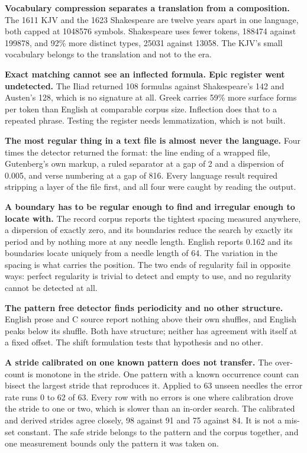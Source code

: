 \textbf{Vocabulary compression separates a translation from a composition.} The 1611 KJV and the 1623 Shakespeare are twelve years apart in one language, both capped at 1048576 symbols. Shakespeare uses fewer tokens, 188474 against 199878, and 92\% more distinct types, 25031 against 13058. The KJV's small vocabulary belongs to the translation and not to the era.

\textbf{Exact matching cannot see an inflected formula. Epic register went undetected.} The Iliad returned 108 formulas against Shakespeare's 142 and Austen's 128, which is no signature at all. Greek carries 59\% more surface forms per token than English at comparable corpus size. Inflection does that to a repeated phrase. Testing the register needs lemmatization, which is not built.

\textbf{The most regular thing in a text file is almost never the language.} Four times the detector returned the format: the line ending of a wrapped file, Gutenberg's own markup, a ruled separator at a gap of 2 and a dispersion of 0.005, and verse numbering at a gap of 816. Every language result required stripping a layer of the file first, and all four were caught by reading the output.

\textbf{A boundary has to be regular enough to find and irregular enough to locate with.} The record corpus reports the tightest spacing measured anywhere, a dispersion of exactly zero, and its boundaries reduce the search by exactly its period and by nothing more at any needle length. English reports 0.162 and its boundaries locate uniquely from a needle length of 64. The variation in the spacing is what carries the position. The two ends of regularity fail in opposite ways: perfect regularity is trivial to detect and empty to use, and no regularity cannot be detected at all.

\textbf{The pattern free detector finds periodicity and no other structure.} English prose and C source report nothing above their own shuffles, and English peaks below its shuffle. Both have structure; neither has agreement with itself at a fixed offset. The shift formulation tests that hypothesis and no other.

\textbf{A stride calibrated on one known pattern does not transfer.} The over-count is monotone in the stride. One pattern with a known occurrence count can bisect the largest stride that reproduces it. Applied to 63 unseen needles the error rate runs 0 to 62 of 63. Every row with no errors is one where calibration drove the stride to one or two, which is slower than an in-order search. The calibrated and derived strides agree closely, 98 against 91 and 75 against 84. It is not a mis-set constant. The safe stride belongs to the pattern and the corpus together, and one measurement bounds only the pattern it was taken on.

